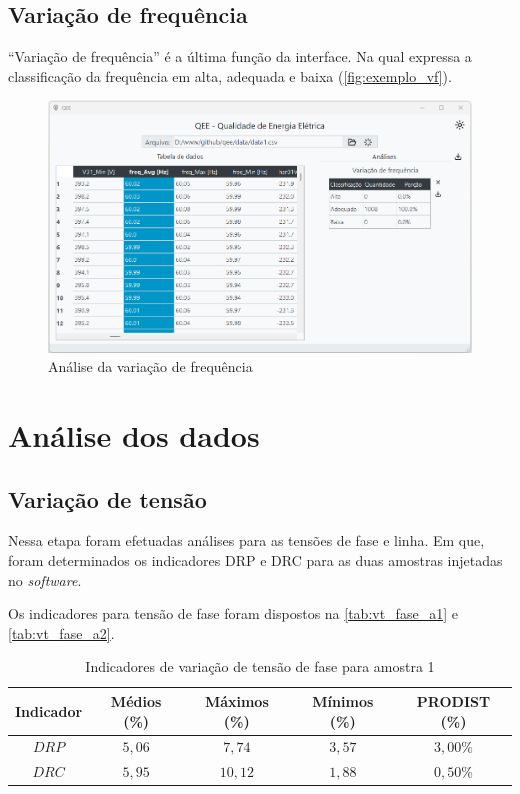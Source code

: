 \subsection{Variação de frequência}

“Variação de frequência” é a última função da interface. Na qual expressa a classificação da frequência em alta, adequada e baixa (\autoref{fig:exemplo_vf}).

\begin{figure}[H]
  \centering
  \caption{Análise da variação de frequência}
  \label{fig:exemplo_vf}
  \includegraphics[width=15cm]{illustrations/figures/exemplo_vf.png}
\end{figure}

\section{Análise dos dados}

\subsection{Variação de tensão}

Nessa etapa foram efetuadas análises para as tensões de fase e linha. Em que, foram determinados os indicadores DRP e DRC para as duas amostras injetadas no \textit{software}.

Os indicadores para tensão de fase foram dispostos na \autoref{tab:vt_fase_a1} e \autoref{tab:vt_fase_a2}.

\begin{table}[H]
  \centering
  \caption{Indicadores de variação de tensão de fase para amostra 1}
  \label{tab:vt_fase_a1}
  \begin{tabular}{@{}ccccc@{}}
    \toprule
    Indicador & Médios (\%) & Máximos (\%) & Mínimos (\%) & PRODIST (\%) \\
    \midrule
    $DRP$ & $5,06$ & $7,74$ & $3,57$ & $3,00\%$ \\
    $DRC$ & $5,95$ & $10,12$ & $1,88$ & $0,50\%$ \\
    \bottomrule
  \end{tabular}
\end{table}

